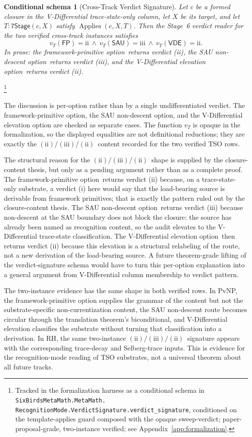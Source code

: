 \documentclass[11pt]{article}
\newcommand{\VDTSO}{V-Differential trace-state-only column}
\newcommand{\OptFP}{framework-primitive option}
\newcommand{\OptSAU}{SAU non-descent option}
\newcommand{\OptVDE}{V-Differential elevation option}
\newcommand{\SigPattern}{$\mathrm{(ii)}/\mathrm{(iii)}/\mathrm{(ii)}$}
\newtheorem{schema}[theorem]{Conditional schema}
\theoremstyle{definition}
\begin{document}
\begin{schema}[Cross-Track Verdict Signature]\label{thm:verdict-signature}
Let \(c\) be a formed closure in the \VDTSO, let \(X\) be its target,
and let \(T:\mathsf{7Stage}(c,X)\) satisfy
\(\operatorname{Applies}(c,X,T)\).  Then the Stage~6 verdict reader
for the two verified cross-track instances satisfies
\[
  v_T(\mathsf{FP})=\mathrm{ii}\ \wedge\
  v_T(\mathsf{SAU})=\mathrm{iii}\ \wedge\
  v_T(\mathsf{VDE})=\mathrm{ii}.
\]
In prose: the \OptFP\ returns verdict (ii), the \OptSAU\ returns
verdict (iii), and the \OptVDE\ returns verdict (ii).
\end{schema}\footnote{\raggedright Tracked in the formalization
harness as a conditional schema in
\texttt{SixBirdsMetaMath.MetaMath.\allowbreak
RecognitionMode.VerdictSignature.\allowbreak verdict\_signature},
conditioned on the template-applies guard composed with the opaque
sweep-verdict; paper-proposal-grade, two-instance verified; see
Appendix~\ref{app:formalization}.}

The discussion is per-option rather than by a single undifferentiated
verdict.  The framework-primitive option, the SAU non-descent option,
and the V-Differential elevation option are checked as separate cases.
The function \(v_T\) is opaque in the
formalization, so the displayed equalities are not definitional
reductions; they are exactly the \SigPattern\ content recorded for the
two verified TSO rows.

The structural reason for the \SigPattern\ shape is supplied by the
closure-content thesis, but only as a pending argument rather than as a
complete proof.  The \OptFP\ returns verdict (ii) because, on a
trace-state-only substrate, a verdict (i) here would say that the
load-bearing source is derivable from framework primitives; that is
exactly the pattern ruled out by the closure-content thesis.  The
\OptSAU\ returns verdict (iii) because non-descent at the SAU boundary
does not block the closure: the source has already been named as
recognition content, so the audit elevates to the V-Differential
trace-state classification.  The \OptVDE\ then returns verdict (ii)
because this elevation is a structural relabeling of the route, not a
new derivation of the load-bearing source.  A future theorem-grade
lifting of the verdict-signature schema would have to turn this
per-option explanation into a general argument from V-Differential
column membership to verdict pattern.

The two-instance evidence has the same shape in both verified rows. In
PvNP, the framework-primitive option supplies the grammar of the content
but not the substrate-specific non-currentization content, the SAU
non-descent route becomes circular through the translation theorem's
biconditional, and V-Differential elevation classifies the substrate
without turning that classification into a derivation. In RH, the same
two-instance \SigPattern\ signature appears with the corresponding
trace-decay and Selberg-trace inputs. This is evidence for the
recognition-mode reading of TSO substrates, not a universal theorem about
all future tracks.
\end{document}
